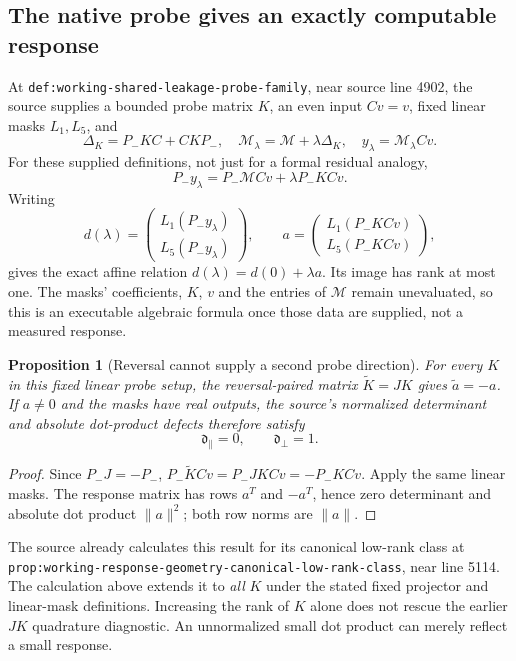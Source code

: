 \documentclass[11pt,a4paper]{article}
\newtheorem{proposition}{Proposition}
\begin{document}
\subsection{The native probe gives an exactly computable response}
At \texttt{def:working-shared-leakage-probe-family}, near source line 4902,
the source supplies a bounded probe matrix $K$, an even input $Cv=v$,
fixed linear masks $L_1,L_5$, and
\[
 \Delta_K=P_-KC+CKP_-,\quad
 \mathcal M_\lambda=\mathcal M+\lambda\Delta_K,\quad
 y_\lambda=\mathcal M_\lambda Cv.
\]
For these supplied definitions, not just for a formal residual analogy,
\[
 P_-y_\lambda=P_-\mathcal M Cv+\lambda P_-KCv.
\]
Writing
\[
 d(\lambda)=
 \begin{pmatrix}L_1(P_-y_\lambda)\\L_5(P_-y_\lambda)\end{pmatrix},
 \qquad
 a=\begin{pmatrix}L_1(P_-KCv)\\L_5(P_-KCv)\end{pmatrix},
\]
gives the exact affine relation $d(\lambda)=d(0)+\lambda a$.
Its image has rank at most one. The masks' coefficients, $K$, $v$ and
the entries of $\mathcal M$ remain unevaluated, so this is an executable
algebraic formula once those data are supplied, not a measured response.

\begin{proposition}[Reversal cannot supply a second probe direction]
\label{prop:native-reversal-probe-rank}
For every $K$ in this fixed linear probe setup, the reversal-paired matrix
$\widetilde K=JK$ gives $\widetilde a=-a$. If $a\ne0$ and the masks have
real outputs, the source's normalized determinant and absolute dot-product
defects therefore satisfy
\[
 \mathfrak d_{\parallel}=0,\qquad \mathfrak d_{\perp}=1.
\]
\end{proposition}
\begin{proof}
Since $P_-J=-P_-$,
$P_-\widetilde KCv=P_-JKCv=-P_-KCv$. Apply the same linear masks.
The response matrix has rows $a^T$ and $-a^T$, hence zero determinant
and absolute dot product $\|a\|^2$; both row norms are $\|a\|$.
\end{proof}
The source already calculates this result for its canonical low-rank
class at \texttt{prop:working-response-geometry-canonical-low-rank-class},
near line 5114. The calculation above extends it to \emph{all} $K$ under
the stated fixed projector and linear-mask definitions. Increasing the
rank of $K$ alone does not rescue the earlier $JK$ quadrature diagnostic.
An unnormalized small dot product can merely reflect a small response.
\end{document}
